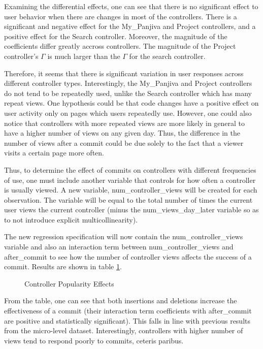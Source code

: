\documentclass[10pt]{article}
\begin{document}
Examining the differential effects, one can see that there is no significant effect to user behavior when there are changes in most of the controllers. There is a significant and negative effect for the My\_Panjiva and Project controllers, and a positive effect for the Search controller. Moreover, the magnitude of the coefficients differ greatly accross controllers. The magnitude of the Project controller's $\Gamma$ is much larger than the $\Gamma$ for the search controller. 

Therefore, it seems that there is significant variation in user responses across different controller types. Interestingly, the My\_Panjiva and Project controllers do not tend to be repeatedly used, unlike the Search controller which has many repeat views. One hypothesis could be that code changes have a positive effect on user activity only on pages which users repeatedly use. However, one could also notice that controllers with more repeated views are more likely in general to have a higher number of views on any given day. Thus, the difference in the number of views after a commit could be due solely to the fact that a viewer visits a certain page more often.

Thus, to determine the effect of commits on controllers with different frequencies of use, one must include another variable that controls for how often a controller is usually viewed. A new variable, num\_controller\_views will be created for each observation. The variable will be equal to the total number of times the current user views the current controller (minus the num\_views\_day\_later variable so as to not introduce explicit multicollinearity). 

The new regression specification will now contain the num\_controller\_views variable and also an interaction term between num\_controller\_views and after\_commit to see how the number of controller views affects the success of a commit. Results are shown in table \ref{table:full-controller-micro}.

\begin{figure}[h!]
\caption{Controller Popularity Effects}


\label{table:full-controller-micro}
\end{figure}

From the table, one can see that both insertions and deletions increase the effectiveness of a commit (their interaction term coefficients with after\_commit are positive and statistically significant). This falls in line with previous results from the micro-level dataset. Interestingly, controllers with higher number of views tend to respond poorly to commits, ceteris paribus. 
\end{document}
